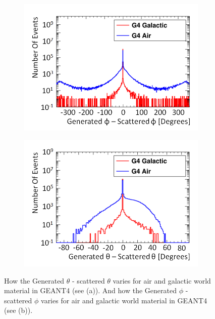 \begin{figure}[!h]
\centering
\begin{subfigure}{.5\textwidth}
  \centering
  \includegraphics[width=\linewidth]{Chapter4/Figs/Raster/CryPlots/genPhi-scatPhiMedText.png}
  \captionsetup{width=.9\linewidth}
  \caption{}
  \label{subFig:genPhi-scatPhi}
\end{subfigure}%
\begin{subfigure}{.5\textwidth}
  \centering
  \includegraphics[width=\linewidth]{Chapter4/Figs/Raster/CryPlots/genTheta-scatThetaMedText.png}
  \captionsetup{width=.9\linewidth}
  \caption{}
  \label{subFig:genTheta-scatPhi}
\end{subfigure}
\caption{How the Generated $\theta$ - scattered $\theta$ varies for air and galactic world material in GEANT4 (see (a)). And how the Generated $\phi$ - scattered $\phi$ varies for air and galactic world material in GEANT4 (see (b)).}
\label{fig:gen-scat_PhiTheta}
\end{figure}


